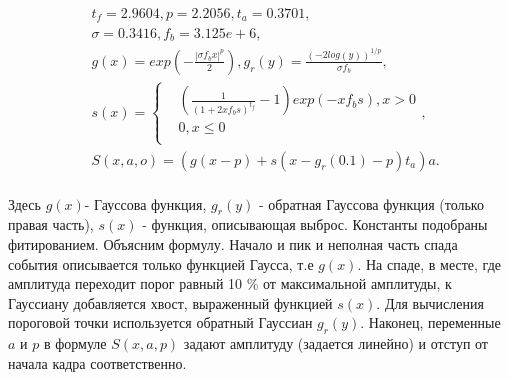 \documentclass[a4paper,14pt]{extreport}
\begin{document}
\begin{equation}\label{eq:shape_formula}
    \begin{split}
    & t_f = 2.9604, p = 2.2056, t_a = 0.3701, \\
    & \sigma = 0.3416, f_b = 3.125e+6, \\
    & g(x) = exp(-\frac{|\sigma f_b x|^p}{2}), g_r(y) = \frac{(-2 log(y))^{1/p}}{\sigma f_b}, \\
    & s(x) = \begin{cases}
    & (\frac{1}{(1 + 2 x f_b s)^{t_f}} - 1) exp(-x f_b s), x > 0 \\
    & 0, x \leq 0 \\
    & \end{cases}, \\
    & S(x, a, o) = (g(x - p) + s(x - g_r(0.1) - p) t_a ) a. \\
    \end{split}
\end{equation}

Здесь $g(x)$- Гауссова функция, $ g_r(y) $ - обратная Гауссова функция (только правая часть), $ s(x) $ - функция, описывающая выброс. Константы подобраны фитированием. Объясним формулу. Начало и пик и неполная часть спада события описывается только функцией Гаусса, т.е $g(x)$. На спаде, в месте, где амплитуда переходит порог равный 10 \% от максимальной амплитуды, к Гауссиану добавляется хвост, выраженный функцией $ s(x) $. Для вычисления пороговой точки используется обратный Гауссиан $ g_r(y) $. Наконец, переменные $ a $ и $ p $ в формуле $ S(x,a,p) $ задают амплитуду (задается линейно) и отступ от начала кадра соответственно.
\end{document}
